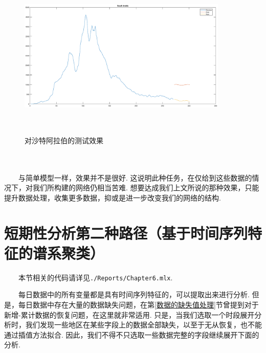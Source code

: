 \documentclass[a4paper, titlepage]{article}
\begin{document}
    \vspace{-1em}
    \begin{minipage}{\textwidth}
        \begin{figure}[H]
            \centering
            \includegraphics[height=8cm, width=10cm]{./images/Chapter5/Pred4.eps}
            \vspace{-1.5em}
            \caption{对沙特阿拉伯的测试效果}
    \end{figure}
    \end{minipage}\\\quad\\
	　　与简单模型一样，效果并不是很好. 这说明此种任务，在仅给到这些数据的情况下，对我们所构建的网络仍相当苦难. 想要达成我们上文所说的那种效果，只能提升数据处理，收集更多数据，抑或是进一步改变我们的网络的结构.

    \newpage
    \section{短期性分析第二种路径（基于时间序列特征的谱系聚类）}\label{第二种路径}
    　　本节相关的代码请详见\texttt{./Reports/Chapter6.mlx}.

    　　每日数据中的所有变量都是具有时间序列特征的，可以提取出来进行分析. 但是，每日数据中存在大量的数据缺失问题，在第\ref{数据的缺失值处理}节曾提到对于新增-累计数据的恢复问题，在这里就非常适用. 只是，当我们选取一个时段展开分析时，我们发现一些地区在某些字段上的数据全部缺失，以至于无从恢复，也不能通过插值方法拟合. 因此，我们不得不只选取一些数据完整的字段继续展开下面的分析.
\end{document}
